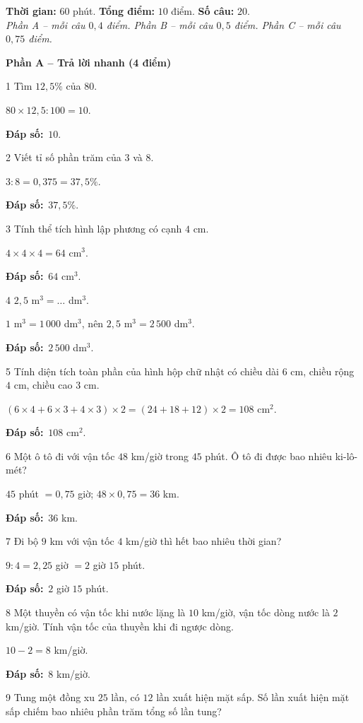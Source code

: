 \documentclass[11pt]{article}
\newif\ifsol \solfalse
\providecommand{\AnsWord}{Đáp số}
\newcommand{\dapso}[1]{\par\textbf{\AnsWord:}\ #1}
\newcommand{\probsol}[1]{%
  \begin{lrbox}{\solmeasure}\begin{minipage}{\dimexpr\linewidth-24pt\relax}#1\end{minipage}\end{lrbox}%
  \ifsol
    \begin{solbox}#1\end{solbox}%
  \else
    \setlength{\solht}{\dimexpr\ht\solmeasure+\dp\solmeasure+0.85cm\relax}%
    \ifdim\solht<1.35cm\setlength{\solht}{1.35cm}\fi
    \begin{tcolorbox}[colback=white,colframe=Line,boxrule=0.8pt,arc=5pt,
      left=8pt,right=8pt,top=4pt,bottom=4pt,height=\solht]{\footnotesize\color{Slate}\itshape\WorkWord}\end{tcolorbox}%
  \fi}
\newcommand{\dividerbar}[1]{\par\vspace{0.6em}\noindent
  \begin{tcolorbox}[enhanced,frame hidden,interior hidden,borderline west={5pt}{0pt}{ProbBlue},
    colback=white,left=12pt,right=12pt,top=5pt,bottom=5pt,arc=4pt]
  {\large\bfseries\color{ProbBlue} #1}\end{tcolorbox}\vspace{0.4em}}
\newcommand{\gap}{\vspace{0.3cm}}
\def\WorkWord{Bài làm:}
\def\AnsWord{Đáp số}
\begin{document}
\begin{knowbox}
\textbf{Thời gian:} $60$ phút. \quad \textbf{Tổng điểm:} $10$ điểm. \quad \textbf{Số câu:} $20$.\\[2pt]\emph{Phần A -- mỗi câu $0{,}4$ điểm. \quad Phần B -- mỗi câu $0{,}5$ điểm. \quad Phần C -- mỗi câu $0{,}75$ điểm.}
\end{knowbox}
\gap
\dividerbar{Phần A -- Trả lời nhanh (4 điểm)}
\begin{probbox}{1}{\relax}
Tìm $12{,}5\%$ của $80$.
\end{probbox}
\probsol{
$80\times12{,}5:100=10$.
\dapso{$10$.}}
\gap
\begin{probbox}{2}{\relax}
Viết tỉ số phần trăm của $3$ và $8$.
\end{probbox}
\probsol{
$3:8=0{,}375=37{,}5\%$.
\dapso{$37{,}5\%$.}}
\gap
\begin{probbox}{3}{\relax}
Tính thể tích hình lập phương có cạnh $4$ cm.
\end{probbox}
\probsol{
$4\times4\times4=64$ cm$^3$.
\dapso{$64$ cm$^3$.}}
\gap
\begin{probbox}{4}{\relax}
$2{,}5$ m$^3=\ldots$ dm$^3$.
\end{probbox}
\probsol{
$1$ m$^3=1\,000$ dm$^3$, nên $2{,}5$ m$^3=2\,500$ dm$^3$.
\dapso{$2\,500$ dm$^3$.}}
\gap
\begin{probbox}{5}{\relax}
Tính diện tích toàn phần của hình hộp chữ nhật có chiều dài $6$ cm, chiều rộng $4$ cm, chiều cao $3$ cm.
\end{probbox}
\probsol{
$(6\times4+6\times3+4\times3)\times2=(24+18+12)\times2=108$ cm$^2$.
\dapso{$108$ cm$^2$.}}
\gap
\begin{probbox}{6}{\relax}
Một ô tô đi với vận tốc $48$ km/giờ trong $45$ phút. Ô tô đi được bao nhiêu ki-lô-mét?
\end{probbox}
\probsol{
$45$ phút $=0{,}75$ giờ; $48\times0{,}75=36$ km.
\dapso{$36$ km.}}
\gap
\begin{probbox}{7}{\relax}
Đi bộ $9$ km với vận tốc $4$ km/giờ thì hết bao nhiêu thời gian?
\end{probbox}
\probsol{
$9:4=2{,}25$ giờ $=2$ giờ $15$ phút.
\dapso{$2$ giờ $15$ phút.}}
\gap
\begin{probbox}{8}{\relax}
Một thuyền có vận tốc khi nước lặng là $10$ km/giờ, vận tốc dòng nước là $2$ km/giờ. Tính vận tốc của thuyền khi đi ngược dòng.
\end{probbox}
\probsol{
$10-2=8$ km/giờ.
\dapso{$8$ km/giờ.}}
\gap
\begin{probbox}{9}{\relax}
Tung một đồng xu $25$ lần, có $12$ lần xuất hiện mặt sấp. Số lần xuất hiện mặt sấp chiếm bao nhiêu phần trăm tổng số lần tung?
\end{probbox}
\end{document}
